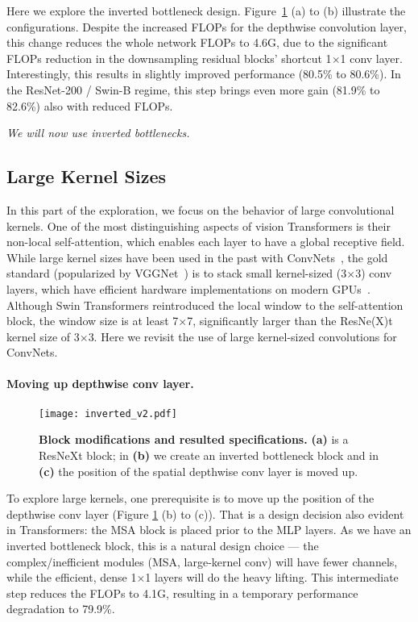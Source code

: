 Here we explore the inverted bottleneck design. Figure~\ref{fig:inverted} (a) to (b) illustrate the configurations. Despite the increased FLOPs for the depthwise convolution layer, this change reduces the whole network FLOPs to 4.6G, due to the significant FLOPs reduction in the downsampling residual blocks' shortcut 1$\times$1 conv layer.
Interestingly, this results in slightly improved performance (80.5\% to 80.6\%). In the ResNet-200 / Swin-B regime, this step brings even more gain (81.9\% to 82.6\%) also with reduced FLOPs.

\textit{We will now use inverted bottlenecks.}

\subsection{Large Kernel Sizes}

In this part of the exploration, we focus on the behavior of large convolutional kernels. One of the most distinguishing aspects of vision Transformers is their non-local self-attention, which enables each layer to have a global receptive field. While large kernel sizes have been used in the past with ConvNets~\cite{alexnet,Szegedy2015}, the gold standard (popularized by VGGNet~\cite{vgg}) is to stack small kernel-sized (3$\times$3) conv layers, which have efficient hardware implementations on modern GPUs~\cite{Lavin2016FastAF}. Although Swin Transformers reintroduced the local window to the self-attention block, the window size is at least 7$\times$7, significantly larger than the ResNe(X)t kernel size of 3$\times$3. Here we revisit the use of large kernel-sized convolutions for ConvNets. 

\paragraph{Moving up depthwise conv layer.}

\begin{figure}
\centering
\texttt{[image: inverted\_v2.pdf]}
\caption{\textbf{Block modifications and resulted specifications.} \textbf{(a)} is a ResNeXt block; in \textbf{(b)} we create an inverted bottleneck block and in \textbf{(c)} the position of the spatial depthwise conv layer is moved up.}
\label{fig:inverted}
\end{figure}

 To explore large kernels, one prerequisite is to move up the position of the depthwise conv layer (Figure \ref{fig:inverted} (b) to (c)). That is a design decision also evident in Transformers: the MSA block is placed prior to the MLP layers. As we have an inverted bottleneck block, this is a natural design choice --- the complex/inefficient modules (MSA, large-kernel conv) will have fewer channels, while the efficient, dense 1$\times$1 layers will do the heavy lifting. This intermediate step reduces the FLOPs to 4.1G, resulting in a temporary performance degradation to 79.9\%.

